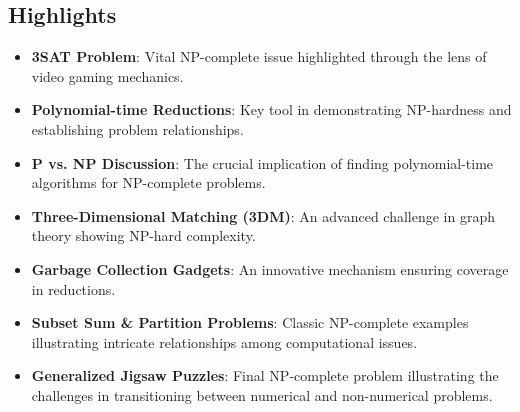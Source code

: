 \documentclass[12pt]{article}
\begin{document}
    \subsection*{Highlights}
    \begin{itemize}
        \item \textbf{3SAT Problem}: Vital NP-complete issue highlighted through the lens of video gaming mechanics.
        \item \textbf{Polynomial-time Reductions}: Key tool in demonstrating NP-hardness and establishing problem relationships.
        \item \textbf{P vs. NP Discussion}: The crucial implication of finding polynomial-time algorithms for NP-complete problems.
        \item \textbf{Three-Dimensional Matching (3DM)}: An advanced challenge in graph theory showing NP-hard complexity.
        \item \textbf{Garbage Collection Gadgets}: An innovative mechanism ensuring coverage in reductions.
        \item \textbf{Subset Sum \& Partition Problems}: Classic NP-complete examples illustrating intricate relationships among computational issues.
        \item \textbf{Generalized Jigsaw Puzzles}: Final NP-complete problem illustrating the challenges in transitioning between numerical and non-numerical problems.
    \end{itemize}
\end{document}
